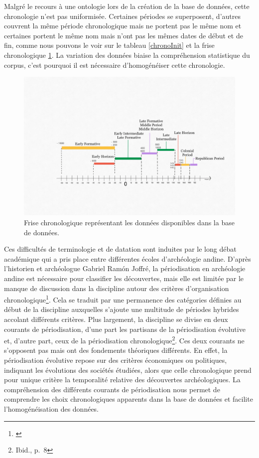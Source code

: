 Malgré le recours à une ontologie lors de la création de la base de données, cette chronologie n'est pas uniformisée. Certaines périodes se superposent, d'autres couvrent la même période chronologique mais ne portent pas le même nom et certaines portent le même nom mais n'ont pas les mêmes dates de début et de fin, comme nous pouvons le voir sur le tableau \ref{chronoInit} et la frise chronologique \ref{chronoInitFri}. La variation des données biaise la compréhension statistique du corpus, c'est pourquoi il est nécessaire d'homogénéiser cette chronologie.
\clearpage

  \begin{figure}[!h]
	\begin{center}
		\includegraphics[width=15cm]{../images/FriseChronologiqueOrig.jpg}
           	 \caption{Frise chronologique représentant les données disponibles dans la base de données.}
           	 \label{chronoInitFri}
	 \end{center}
  \end{figure}


Ces difficultés de terminologie et de datation sont induites par le long débat académique qui a pris place entre différentes écoles d'archéologie andine. D'après l'historien et archéologue Gabriel Ramón Joffré, la périodisation en archéologie andine est nécessaire pour classifier les découvertes, mais elle est limitée par le manque de discussion dans la discipline autour des critères d'organisation chronologique\footnote{\cite[p.~7]{ramonjoffrePeriodificacionArqueologiaPeruana2005}}. Cela se traduit par une permanence des catégories définies au début de la discipline auxquelles s'ajoute une multitude de périodes hybrides accolant différents critères. Plus largement, la discipline se divise en deux courants de périodisation, d'une part les partisans de la périodisation évolutive et, d'autre part, ceux de la périodisation chronologique\footnote{Ibid., p.~8}. Ces deux courants ne s'opposent pas mais ont des fondements théoriques différents. En effet, la périodisation évolutive repose sur des critères économiques ou politiques, indiquant les évolutions des sociétés étudiées, alors que celle chronologique prend pour unique critère la temporalité relative des découvertes archéologiques. La compréhension des différents courants de périodisation nous permet de comprendre les choix chronologiques apparents dans la base de données et facilite l'homogénéisation des données. 

